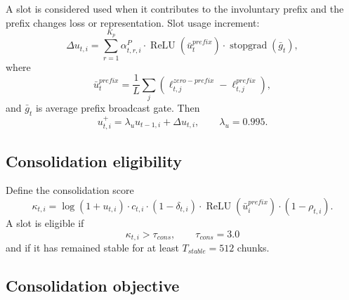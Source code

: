 \documentclass[11pt]{article}
\begin{document}
A slot is considered used when it contributes to the involuntary prefix and the prefix changes loss or representation. Slot usage increment:
\begin{equation}
    \Delta u_{t,i}=\sum_{r=1}^{K_p}\alpha_{t,r,i}^{P}\cdot \operatorname{ReLU}(\bar{u}^{prefix}_t)\cdot \operatorname{stopgrad}(\bar{g}_t),
\end{equation}
where
\begin{equation}
    \bar{u}^{prefix}_t=\frac{1}{L}\sum_j\left(\ell^{zero-prefix}_{t,j}-\ell^{prefix}_{t,j}\right),
\end{equation}
and \(\bar{g}_t\) is average prefix broadcast gate. Then
\begin{equation}
    u_{t,i}^{+}=\lambda_u u_{t-1,i}+\Delta u_{t,i}, \qquad \lambda_u=0.995.
\end{equation}

\subsection{Consolidation eligibility}

Define the consolidation score
\begin{equation}
    \kappa_{t,i}=\log(1+u_{t,i})\cdot c_{t,i}\cdot(1-\delta_{t,i})\cdot \operatorname{ReLU}(\bar{u}^{prefix}_{i})\cdot (1-\rho_{t,i}).
\end{equation}
A slot is eligible if
\begin{equation}
    \kappa_{t,i}>\tau_{cons}, \qquad \tau_{cons}=3.0
\end{equation}
and if it has remained stable for at least \(T_{stable}=512\) chunks.

\subsection{Consolidation objective}
\end{document}
